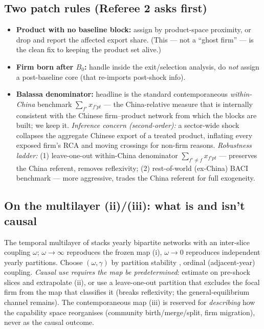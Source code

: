 \documentclass[11pt]{article}
\begin{document}
\subsection{Two patch rules (Referee 2 asks first)}
\begin{itemize}[leftmargin=1.4em,noitemsep]
  \item \textbf{Product with no baseline block:} assign by product-space proximity,
        or drop and report the affected export share. (This --- not a ``ghost
        firm'' --- is the clean fix to keeping the product set alive.)
  \item \textbf{Firm born after $B_0$:} handle inside the exit/selection analysis,
        do \emph{not} assign a post-baseline core (that re-imports post-shock info).
  \item \textbf{Balassa denominator:} headline is the standard contemporaneous
        \emph{within-China} benchmark $\sum_{f'}x_{f'pt}$ --- the China-relative measure
        that is internally consistent with the Chinese firm--product network from which
        the blocks are built; we keep it. \emph{Inference concern (second-order):} a
        sector-wide shock collapses the aggregate Chinese export of a treated product,
        inflating every exposed firm's RCA and moving crossings for non-firm reasons.
        \emph{Robustness ladder:} (1) leave-one-out within-China denominator
        $\sum_{f'\neq f}x_{f'pt}$ --- preserves the China referent, removes reflexivity;
        (2) rest-of-world (ex-China) BACI benchmark --- more aggressive, trades the
        China referent for full exogeneity.
\end{itemize}

\subsection{On the multilayer (ii)/(iii): what is and isn't causal}
The temporal multilayer of \citet{mucha2010} stacks yearly bipartite networks with an
inter-slice coupling $\omega$; $\omega\to\infty$ reproduces the frozen map (i),
$\omega\to 0$ reproduces independent yearly partitions. Choose $(\omega,\gamma)$ by
partition stability \citep{bazzi2016}, ordinal (adjacent-year) coupling. \emph{Causal
use requires the map be predetermined}: estimate on pre-shock slices and extrapolate
(ii), or use a leave-one-out partition that excludes the focal firm from the map that
classifies it (breaks reflexivity; the general-equilibrium channel remains). The
contemporaneous map (iii) is reserved for \emph{describing} how the capability space
reorganises (community birth/merge/split, firm migration), never as the causal outcome.
\end{document}
